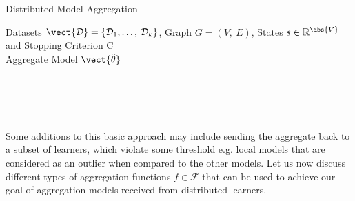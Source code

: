 \begin{algo}{Distributed Model Aggregation}
    \begin{algorithm}[H]
    \caption[Distributed Learning with PGMs]{General approach to distributed learning. While the stopping criterion $C$ has not been fulfilled the distributed learners update the observed data in each round and train a new or updated model. Afterward, the local parameters are sent to the coordinator and aggregated with some aggregation algorithm.}
        \begin{algorithmic}[1]
            \label{alg:magg}
            \REQUIRE Datasets $\mathcal{\vect{D}} = \{\mathcal{D}_1, \ldots,\: \mathcal{D}_k\}$, Graph $G=(V,\:E)$, States $s \in \mathbb{R}^{\abs{V}}$ and Stopping Criterion C \\
            \ENSURE Aggregate Model $\vect{\tilde{\theta}}$  \\
             \\
             \\
            \\
                 \\
            \ENDIF
            \ENDWHILE
            \RETURN {$\vect{\tilde{\theta}}$}
        \end{algorithmic}
    \end{algorithm}
\end{algo}
Some additions to this basic approach may include sending the aggregate back to a subset of learners, which violate some threshold e.g. local models that are considered as an outlier when compared to the other models.
Let us now discuss different types of aggregation functions $f \in \mathcal{F}$ that can be used to achieve our goal of aggregation models received from distributed learners.

